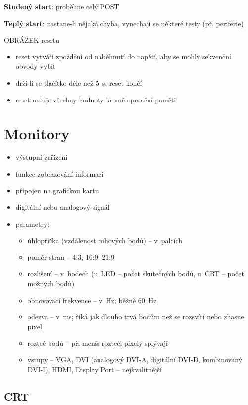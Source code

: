 \documentclass[a4paper,12pt]{article}
\providecommand{\tightlist}{%
\setlength{\itemsep}{0pt}\setlength{\parskip}{0pt}}
\begin{document}
\textbf{Studený start}: proběhne celý POST

\textbf{Teplý start}: nastane-li nějaká chyba, vynechají se některé testy (př. periferie)

OBRÁZEK resetu

\begin{itemize}
  \tightlist
  \item reset vytváří zpoždění od naběhnutí do napětí, aby se mohly sekvenční
  obvody vybít
  \item drží-li se tlačítko déle než 5~s, reset končí
  \item reset nuluje všechny hodnoty kromě operační paměti
\end{itemize}

\section{Monitory}

\begin{itemize}
  \tightlist
  \item výstupní zařízení
  \item funkce zobrazování informací
  \item připojen na grafickou kartu
  \item digitální nebo analogový signál
  \item parametry:
  \begin{itemize}
    \tightlist
    \item úhlopříčka (vzdálenost rohových bodů) -- v~palcích
    \item poměr stran -- 4:3, 16:9, 21:9
    \item rozlišení -- v~bodech (u~LED -- počet skutečných bodů, u~CRT -- počet
    možných bodů)
    \item obnovovací frekvence -- v~Hz; běžně 60~Hz
    \item odezva -- v~ms; říká jak dlouho trvá bodům než se rozsvítí nebo zhasne
    pixel
    \item rozteč bodů -- při menší rozteči pixely splývají
    \item vstupy -- VGA, DVI (analogový DVI-A, digitální DVI-D, kombinovaný DVI-I),
    HDMI, Display Port -- nejkvalitnější
  \end{itemize}
\end{itemize}

\newpage

\subsection{CRT}
\end{document}
